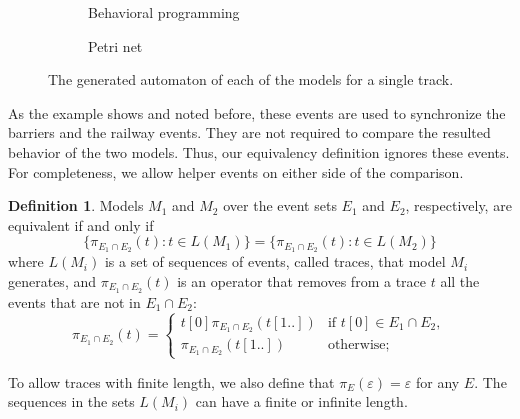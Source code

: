 \documentclass[10pt,journal,compsoc]{IEEEtran}
\theoremstyle{definition}
\newtheorem{definition}{Definition}
\begin{document}
\begin{figure*}
\centering
\begin{subfigure}{.3\textwidth}
  \begin{adjustbox}{width=\linewidth}
\end{adjustbox}
  \caption{Behavioral programming}
  \label{fig:sub-first}
\end{subfigure}\qquad\qquad\qquad\qquad\qquad
\begin{subfigure}{.3\textwidth}
  \begin{adjustbox}{width=\linewidth}
\end{adjustbox}
  \caption{Petri net}
  \label{fig:sub-second}
\end{subfigure}
\caption{The generated automaton of each of the models for a single track.}
\label{fig:models_automata}
\end{figure*}

As the example shows and noted before, these events are used to synchronize the barriers and the railway events. They are not required to compare the resulted behavior of the two models. Thus, our equivalency definition ignores these events. For completeness, we allow helper events on either side of the comparison.

\begin{definition}
Models $M_1$ and $M_2$ over the event sets $E_1$ and $E_2$, respectively, are equivalent if and only if 
$$\{ \pi_{E_1 \cap E_2}(t) \colon t \in L(M_1)\}  = \{ \pi_{E_1 \cap E_2}(t) \colon t \in L(M_2)\}$$
where $L(M_i)$ is a set of sequences of events, called traces, that model $M_i$ generates,  and $\pi_{E_1 \cap E_2}(t)$ is an operator that removes from a trace $t$ all the events that are not in $E_1 \cap E_2$: 
$$\pi_{E_1 \cap E_2}( t) = \begin{cases} t[0] \pi_{E_1 \cap E_2}(t[1..]) & \text{if } t[0] \in E_1 \cap E_2, \\ \pi_{E_1 \cap E_2}(t[1..]) & \text{otherwise;} \end{cases}$$

\noindent To allow traces with finite length, we also define that $\pi_{E}(\varepsilon)= \varepsilon$ for any $E$. The sequences in the sets $L(M_i)$ can have a finite or infinite length. 
\end{definition}
\end{document}
